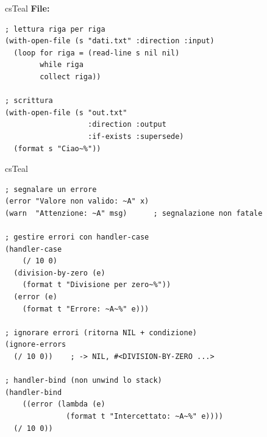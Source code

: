 \begin{refbox}{csTeal}
\medskip
\textbf{File:}\nopagebreak
\begin{lstlisting}
; lettura riga per riga
(with-open-file (s "dati.txt" :direction :input)
  (loop for riga = (read-line s nil nil)
        while riga
        collect riga))

; scrittura
(with-open-file (s "out.txt"
                   :direction :output
                   :if-exists :supersede)
  (format s "Ciao~%"))
\end{lstlisting}

\end{refbox}

\begin{refbox}{csTeal}
\label{sec:errori}

\begin{lstlisting}
; segnalare un errore
(error "Valore non valido: ~A" x)
(warn  "Attenzione: ~A" msg)      ; segnalazione non fatale

; gestire errori con handler-case
(handler-case
    (/ 10 0)
  (division-by-zero (e)
    (format t "Divisione per zero~%"))
  (error (e)
    (format t "Errore: ~A~%" e)))

; ignorare errori (ritorna NIL + condizione)
(ignore-errors
  (/ 10 0))    ; -> NIL, #<DIVISION-BY-ZERO ...>

; handler-bind (non unwind lo stack)
(handler-bind
    ((error (lambda (e)
              (format t "Intercettato: ~A~%" e))))
  (/ 10 0))
\end{lstlisting}

\end{refbox}


